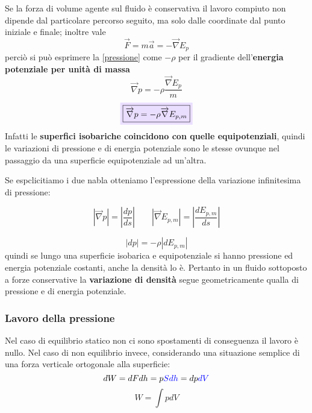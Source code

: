 \documentclass[x11names]{article}
\newcommand{\viola}[1]{\colorbox{myred}{$\displaystyle #1$}}
\begin{document}
		\noindent
		Se la forza di volume agente sul fluido è conservativa il lavoro compiuto non dipende dal particolare percorso seguito, ma solo dalle coordinate dal punto iniziale e finale; inoltre vale
		\[ 
		\overrightarrow{F} = m \vec{a} = -\overrightarrow{\nabla}E_p
		\]
		perciò si può esprimere la \ref{pressione} come \(-\rho\) per il gradiente dell'\textbf{energia potenziale per unità di massa}
		\[
			\overrightarrow{\nabla} p = -\rho \frac{\overrightarrow{\nabla}E_p}{m}
		\]
		\begin{equation}\label{gradiente pressione}
			\viola{\boxed{\overrightarrow{\nabla} p = -\rho \overrightarrow{\nabla}E_{p,m}}}
		\end{equation}
		Infatti le \textbf{superfici isobariche coincidono con quelle equipotenziali}, quindi le variazioni di pressione e di energia potenziale sono le stesse ovunque nel passaggio da una superficie equipotenziale ad un'altra. 
		
		Se espclicitiamo i due nabla otteniamo l'espressione della variazione infinitesima di pressione:
		
		\[ 
		\boxed{\left|\overrightarrow{\nabla}p \right|= \left|\frac{dp}{ds}\right|} \qquad \boxed{\left|\overrightarrow{\nabla}E_{p,m} \right|= \left|\frac{dE_{p,m}}{ds}\right|}
		\]
		
		\[ 
		|dp |= -\rho |dE_{p,m}|
		\]
		quindi se lungo una superficie isobarica e equipotenziale si hanno pressione ed energia potenziale costanti, anche la densità lo è. Pertanto in un fluido sottoposto a forze conservative la \textbf{variazione di densità} segue geometricamente qualla di pressione e di energia potenziale.
		
	\subsubsection{Lavoro della pressione}
	Nel caso di equilibrio statico non ci sono spostamenti di conseguenza il lavoro è nullo. Nel caso di non equilibrio invece, considerando una situazione semplice di una forza verticale ortogonale alla superficie:
	\[ 
	dW = dF dh = p\textcolor{blue}{S dh }= dp \textcolor{blue}{dV }
	\] 
	\begin{equation}
		W = \int{pdV}
	\end{equation}
	
\end{document}
